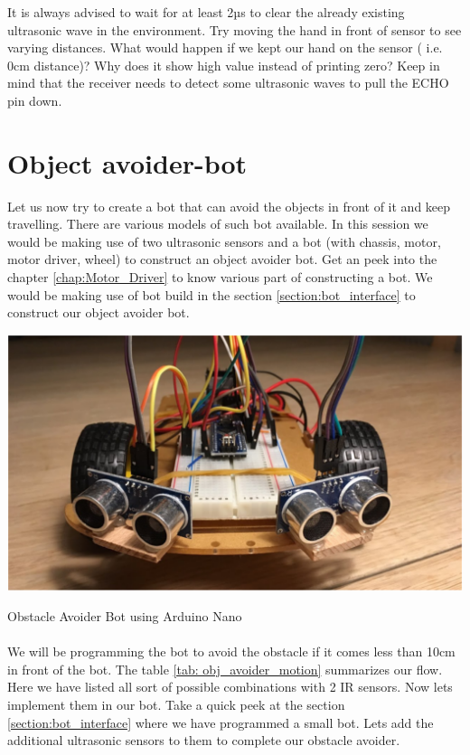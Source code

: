It is always advised to wait for at least 2µs to clear the already existing ultrasonic wave in the environment. Try moving the hand in front of sensor to see varying distances. What would happen if we kept our hand on the sensor ( i.e. 0cm distance)? Why does it show high value instead of printing zero? Keep in mind that the receiver needs to detect some ultrasonic waves to pull the ECHO pin down.

\section{Object avoider-bot}

Let us now try to create a bot that can avoid the objects in front of it and keep travelling. There are various models of such bot available. In this session we would be making use of two ultrasonic sensors and a bot (with chassis, motor, motor driver, wheel) to construct an object avoider bot. Get an peek into the chapter \ref{chap:Motor_Driver} to know various part of constructing a bot. We would be making use of bot build in the section \ref{section:bot_interface} to construct our object avoider bot.

\begin{marginfigure}
    \centering
    \includegraphics[width=\textwidth]{Images/Ultrasonic/nano_obj_avoider1.png}
    \caption[Obstacle Avoider Bot]{Obstacle Avoider Bot using Arduino Nano}
\end{marginfigure}

\paragraph{ } We will be programming the bot to avoid the obstacle if it comes less than 10cm in front of the bot. The table \ref{tab: obj_avoider_motion} summarizes our flow. Here we have listed all sort of possible combinations with 2 IR sensors. Now lets implement them in our bot. Take a quick peek at the section \ref{section:bot_interface} where we have programmed a small bot. Lets add the additional ultrasonic sensors to them to complete our obstacle avoider.


